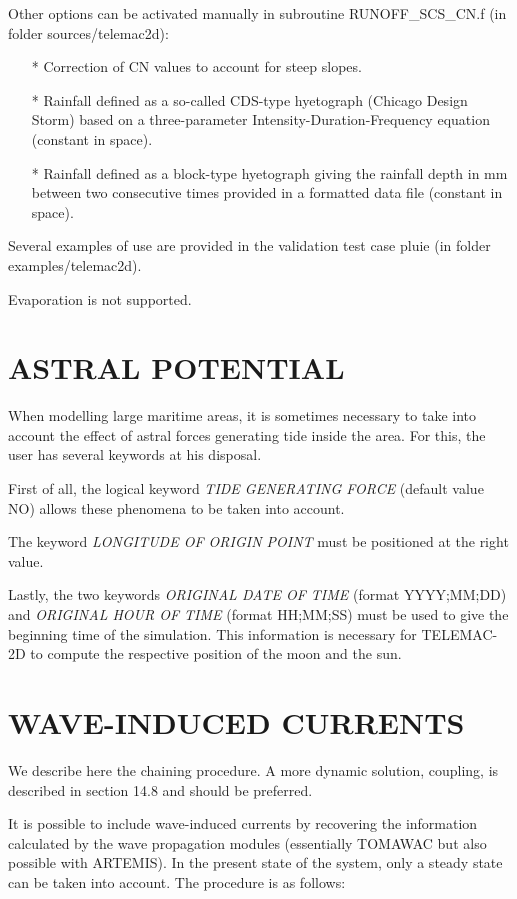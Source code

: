 Other options can be activated manually in subroutine RUNOFF\_SCS\_CN.f (in folder sources/telemac2d):
\begin{itemize}
\item[*] Correction of CN values to account for steep slopes.
\item[*] Rainfall defined as a so-called CDS-type hyetograph (Chicago Design Storm) based on a three-parameter Intensity-Duration-Frequency equation (constant in space).
\item[*] Rainfall defined as a block-type hyetograph giving the rainfall depth in mm between two consecutive times provided in a formatted data file (constant in space).
\end{itemize}
Several examples of use are provided in the validation test case pluie (in folder examples/telemac2d).

Evaporation is not supported.


\section{ ASTRAL POTENTIAL}

 When modelling large maritime areas, it is sometimes necessary to take into account the effect of astral forces generating tide inside the area. For this, the user has several keywords at his disposal.

 First of all, the logical keyword \textit{TIDE GENERATING FORCE} (default value NO) allows these phenomena to be taken into account.

 The keyword \textit{LONGITUDE OF ORIGIN POINT}  must be positioned at the right value.

 Lastly, the two keywords \textit{ORIGINAL DATE OF TIME} (format YYYY;MM;DD) and \textit{ORIGINAL HOUR OF TIME}  (format HH;MM;SS) must be used to give the beginning time of the simulation. This information is necessary for TELEMAC-2D to compute the respective position of the moon and the sun.


\section{ WAVE-INDUCED CURRENTS}

 We describe here the chaining procedure.  A more dynamic solution, coupling, is described in section 14.8 and should be preferred.

 It is possible to include wave-induced currents by recovering the information calculated by the wave propagation modules (essentially TOMAWAC but also possible with ARTEMIS). In the present state of the system, only a steady state can be taken into account. The procedure is as follows:

